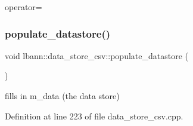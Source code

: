 operator= 

\mbox{\label{classlbann_1_1data__store__csv_a6184c48ec096372899e127235bb741da}} 
\subsubsection{\texorpdfstring{populate\+\_\+datastore()}{populate\_datastore()}}
{\footnotesize\ttfamily void lbann\+::data\+\_\+store\+\_\+csv\+::populate\+\_\+datastore (\begin{DoxyParamCaption}{ }\end{DoxyParamCaption})\hspace{0.3cm}{\ttfamily [protected]}}



fills in m\+\_\+data (the data store) 



Definition at line 223 of file data\+\_\+store\+\_\+csv.\+cpp.


